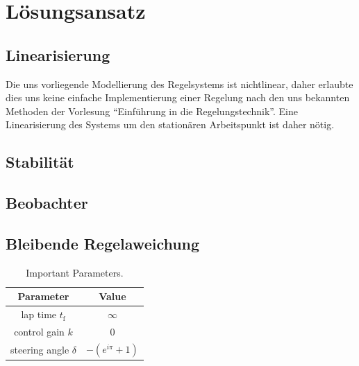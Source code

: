 \documentclass[pdf]{ifacconf}
\begin{document}
	
\section{Lösungsansatz}

	\subsection{Linearisierung}
	Die uns vorliegende Modellierung des Regelsystems ist nichtlinear, daher erlaubte dies uns keine einfache Implementierung einer Regelung nach den uns bekannten Methoden der Vorlesung ``Einführung in die Regelungstechnik''. 
	Eine Linearisierung des Systems um den stationären Arbeitspunkt ist daher nötig.

	\subsection {Stabilität}


	\subsection {Beobachter}


	\subsection{Bleibende Regelaweichung}





\begin{table}[h]
\caption{Important Parameters.}
\label{table:working plan}
\centering
\begin{tabular}{|c|c|}
\hline
\bfseries Parameter & \bfseries Value \\ \hline \hline
lap time $t_{\text{f}}$ & $\infty$ \\ \hline
control gain $k$ & $0$ \\ \hline
steering angle $\delta$ & $-\left( e^{i \pi}+1\right)$ \\ \hline
 \end{tabular}
\end{table}
\end{document}
